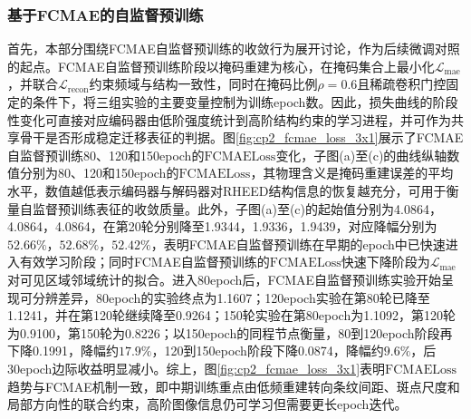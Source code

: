 \setlength{\textfloatsep}{8pt plus 2pt minus 2pt}
\setlength{\floatsep}{8pt plus 2pt minus 2pt}
\setlength{\intextsep}{8pt plus 2pt minus 2pt}
\setlength{\abovecaptionskip}{4pt}
\setlength{\belowcaptionskip}{0pt}

\subsubsection{基于FCMAE的自监督预训练}

首先，本部分围绕FCMAE自监督预训练的收敛行为展开讨论，作为后续微调对照的起点。FCMAE自监督预训练阶段以掩码重建为核心，在掩码集合上最小化$\mathcal{L}_{\mathrm{mae}}$，并联合$\mathcal{L}_{\mathrm{recon}}$约束频域与结构一致性，同时在掩码比例$\rho=0.6$且稀疏卷积门控固定的条件下，将三组实验的主要变量控制为训练epoch数。因此，损失曲线的阶段性变化可直接对应编码器由低阶强度统计到高阶结构约束的学习进程，并可作为共享骨干是否形成稳定迁移表征的判据。图\ref{fig:cp2_fcmae_loss_3x1}展示了FCMAE自监督预训练80、120和150epoch的$\mathrm{FCMAE Loss}$变化，子图(a)至(c)的曲线纵轴数值分别为80、120和150epoch的$\mathrm{FCMAE Loss}$，其物理含义是掩码重建误差的平均水平，数值越低表示编码器与解码器对RHEED结构信息的恢复越充分，可用于衡量自监督预训练表征的收敛质量。此外，子图(a)至(c)的起始值分别为4.0864，4.0864，4.0864，在第20轮分别降至1.9344，1.9336，1.9439，对应降幅分别为$52.66\%$，$52.68\%$，$52.42\%$，表明FCMAE自监督预训练在早期的epoch中已快速进入有效学习阶段；同时FCMAE自监督预训练的$\mathrm{FCMAE Loss}$快速下降阶段为$\mathcal{L}_{\mathrm{mae}}$对可见区域邻域统计的拟合。进入80epoch后，FCMAE自监督预训练实验开始呈现可分辨差异，80epoch的实验终点为1.1607；120epoch实验在第80轮已降至1.1241，并在第120轮继续降至0.9264；150轮实验在第80epoch为1.1092，第120轮为0.9100，第150轮为0.8226；以150epoch的同程节点衡量，80到120epoch阶段再下降0.1991，降幅约$17.9\%$，120到150epoch阶段下降0.0874，降幅约$9.6\%$，后30epoch边际收益明显减小。综上，图\ref{fig:cp2_fcmae_loss_3x1}表明$\mathrm{FCMAE Loss}$趋势与FCMAE机制一致，即中期训练重点由低频重建转向条纹间距、斑点尺度和局部方向性的联合约束，高阶图像信息仍可学习但需要更长epoch迭代。

